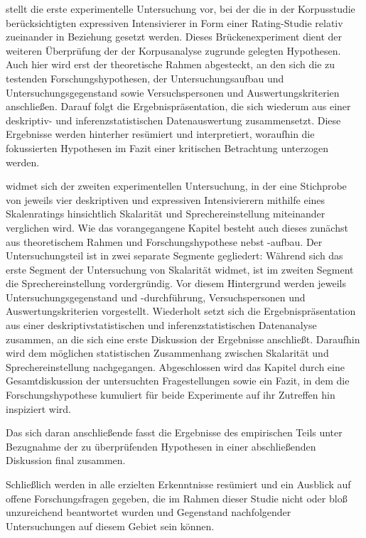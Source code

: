  stellt die erste experimentelle Untersuchung vor, bei der die in der Korpusstudie berücksichtigten expressiven Intensivierer in Form einer Rating-Studie relativ zueinander in Beziehung gesetzt werden. Dieses Brückenexperiment dient der weiteren Überprüfung der der Korpusanalyse zugrunde gelegten Hypothesen. Auch hier wird erst der theoretische Rahmen abgesteckt, an den sich die zu testenden Forschungshypothesen, der Untersuchungsaufbau und Untersuchungsgegenstand sowie Versuchspersonen und Auswertungskriterien anschließen. Darauf folgt die Ergebnispräsentation, die sich wiederum aus einer deskriptiv- und inferenzstatistischen Datenauswertung zusammensetzt. Diese Ergebnisse werden hinterher resümiert und interpretiert, woraufhin die fokussierten Hypothesen im Fazit einer kritischen Betrachtung unterzogen werden.

 widmet sich der zweiten experimentellen Untersuchung, in der eine Stichprobe von jeweils vier deskriptiven und expressiven Intensivierern mithilfe eines Skalenratings hinsichtlich Skalarität und Sprechereinstellung miteinander verglichen wird. Wie das vorangegangene Kapitel besteht auch dieses zunächst aus theoretischem Rahmen und Forschungshypothese nebst -aufbau. Der Untersuchungsteil ist in zwei separate Segmente gegliedert: Während sich das erste Segment der Untersuchung von Skalarität widmet, ist im zweiten Segment die Sprechereinstellung vordergründig. Vor diesem Hintergrund werden jeweils Untersuchungsgegenstand und -durchführung, Versuchspersonen und Auswertungskriterien vorgestellt. Wiederholt setzt sich die Ergebnispräsentation aus einer deskriptivstatistischen und inferenzstatistischen Datenanalyse zusammen, an die sich eine erste Diskussion der Ergebnisse anschließt. Daraufhin wird dem möglichen statistischen Zusammenhang zwischen Skalarität und Sprechereinstellung nachgegangen. Abgeschlossen wird das Kapitel durch eine Gesamtdiskussion der untersuchten Fragestellungen sowie ein Fazit, in dem die Forschungshypothese kumuliert für beide Experimente auf ihr Zutreffen hin inspiziert wird.

Das sich daran anschließende  fasst die Ergebnisse des empirischen Teils unter Bezugnahme der zu überprüfenden Hypothesen in einer abschließenden Diskussion final zusammen.

 Schließlich werden in  alle erzielten Erkenntnisse resümiert und ein Ausblick auf offene Forschungsfragen gegeben, die im Rahmen dieser Studie nicht oder bloß unzureichend beantwortet wurden und Gegenstand nachfolgender Untersuchungen auf diesem Gebiet sein können.





